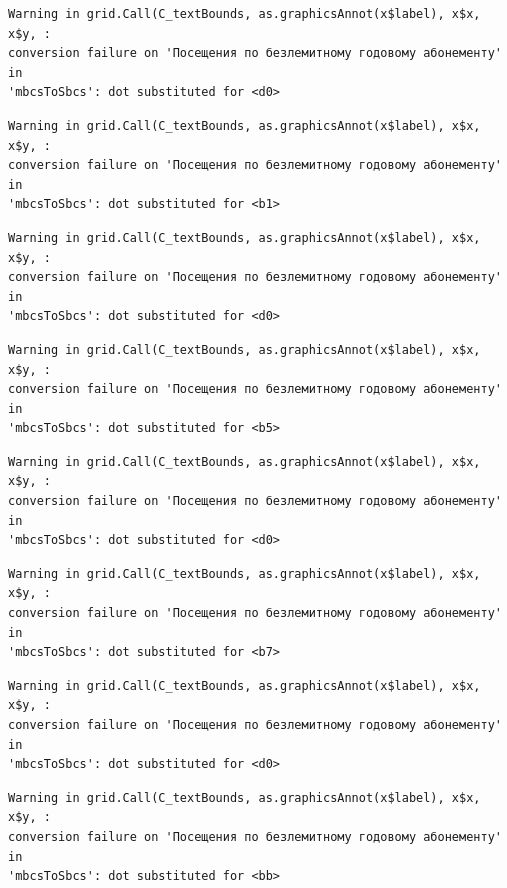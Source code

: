 \documentclass[
  letterpaper,
  DIV=11,
  numbers=noendperiod]{scrartcl}
\begin{document}
\begin{verbatim}
Warning in grid.Call(C_textBounds, as.graphicsAnnot(x$label), x$x, x$y, :
conversion failure on 'Посещения по безлемитному годовому абонементу' in
'mbcsToSbcs': dot substituted for <d0>
\end{verbatim}

\begin{verbatim}
Warning in grid.Call(C_textBounds, as.graphicsAnnot(x$label), x$x, x$y, :
conversion failure on 'Посещения по безлемитному годовому абонементу' in
'mbcsToSbcs': dot substituted for <b1>
\end{verbatim}

\begin{verbatim}
Warning in grid.Call(C_textBounds, as.graphicsAnnot(x$label), x$x, x$y, :
conversion failure on 'Посещения по безлемитному годовому абонементу' in
'mbcsToSbcs': dot substituted for <d0>
\end{verbatim}

\begin{verbatim}
Warning in grid.Call(C_textBounds, as.graphicsAnnot(x$label), x$x, x$y, :
conversion failure on 'Посещения по безлемитному годовому абонементу' in
'mbcsToSbcs': dot substituted for <b5>
\end{verbatim}

\begin{verbatim}
Warning in grid.Call(C_textBounds, as.graphicsAnnot(x$label), x$x, x$y, :
conversion failure on 'Посещения по безлемитному годовому абонементу' in
'mbcsToSbcs': dot substituted for <d0>
\end{verbatim}

\begin{verbatim}
Warning in grid.Call(C_textBounds, as.graphicsAnnot(x$label), x$x, x$y, :
conversion failure on 'Посещения по безлемитному годовому абонементу' in
'mbcsToSbcs': dot substituted for <b7>
\end{verbatim}

\begin{verbatim}
Warning in grid.Call(C_textBounds, as.graphicsAnnot(x$label), x$x, x$y, :
conversion failure on 'Посещения по безлемитному годовому абонементу' in
'mbcsToSbcs': dot substituted for <d0>
\end{verbatim}

\begin{verbatim}
Warning in grid.Call(C_textBounds, as.graphicsAnnot(x$label), x$x, x$y, :
conversion failure on 'Посещения по безлемитному годовому абонементу' in
'mbcsToSbcs': dot substituted for <bb>
\end{verbatim}
\end{document}
